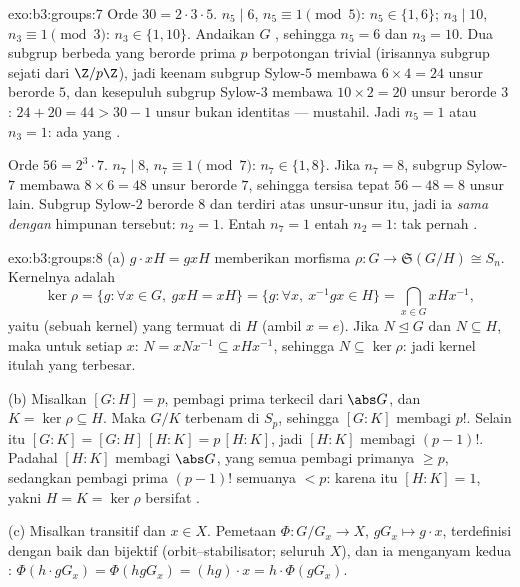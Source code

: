 \begin{solution}{exo:b3:groups:7}
Orde $30 = 2 \cdot 3 \cdot 5$. $n_5 \mid 6$, $n_5 \equiv 1 \pmod
5$: $n_5 \in \{1, 6\}$; $n_3 \mid 10$, $n_3 \equiv 1 \pmod 3$:
$n_3 \in \{1, 10\}$. Andaikan $G$ , sehingga $n_5 = 6$ dan $n_3 =
10$. Dua subgrup berbeda yang berorde prima $p$ berpotongan trivial
(irisannya subgrup sejati dari $\Z/p\Z$), jadi keenam
subgrup Sylow-$5$ membawa $6 \times 4 = 24$ unsur berorde $5$,
dan kesepuluh subgrup Sylow-$3$ membawa $10 \times 2 = 20$ unsur
berorde $3$: $24 + 20 = 44 > 30 - 1$ unsur bukan identitas ---
mustahil. Jadi $n_5 = 1$ atau $n_3 = 1$: ada  yang .

Orde $56 = 2^3 \cdot 7$. $n_7 \mid 8$, $n_7 \equiv 1 \pmod 7$:
$n_7 \in \{1, 8\}$. Jika $n_7 = 8$, subgrup Sylow-$7$ membawa $8
\times 6 = 48$ unsur berorde $7$, sehingga tersisa tepat $56 - 48 =
8$ unsur lain. Subgrup Sylow-$2$ berorde $8$ dan terdiri
atas unsur-unsur itu, jadi ia \emph{sama dengan} himpunan tersebut: $n_2 = 1$.
Entah $n_7 = 1$ entah $n_2 = 1$: tak pernah .
\end{solution}

\begin{solution}{exo:b3:groups:8}
(a)  $g \cdot xH = gxH$ memberikan morfisma $\rho \colon G
\to \mathfrak S(G/H) \cong S_n$. Kernelnya adalah
\[
\ker\rho = \{g : \forall x \in G,\ gxH = xH\}
= \{g : \forall x,\ x^{-1}gx \in H\}
= \bigcap_{x \in G} xHx^{-1},
\]
yaitu  (sebuah kernel) yang termuat di $H$ (ambil $x = e$). Jika
$N \trianglelefteq G$ dan $N \subseteq H$, maka untuk setiap $x$: $N
= xNx^{-1} \subseteq xHx^{-1}$, sehingga $N \subseteq \ker\rho$: jadi
kernel itulah yang terbesar.

(b) Misalkan $[G:H] = p$, pembagi prima terkecil dari $\abs G$, dan $K =
\ker\rho \subseteq H$. Maka $G/K$ terbenam di $S_p$, sehingga $[G:K]$
membagi $p!$. Selain itu $[G:K] = [G:H]\,[H:K] = p\,[H:K]$, jadi $[H:K]$
membagi $(p-1)!$. Padahal $[H:K]$ membagi $\abs G$, yang semua pembagi
primanya $\geq p$, sedangkan pembagi prima $(p-1)!$
semuanya $< p$: karena itu $[H:K] = 1$, yakni $H = K = \ker \rho$ bersifat
.

(c) Misalkan  transitif dan $x \in X$. Pemetaan $\Phi
\colon G/G_x \to X$, $gG_x \mapsto g \cdot x$, terdefinisi dengan baik dan
bijektif (orbit--stabilisator;  seluruh $X$), dan ia
menganyam kedua : $\Phi(h \cdot gG_x) = \Phi(hgG_x) = (hg)
\cdot x = h \cdot \Phi(gG_x)$.
\end{solution}

